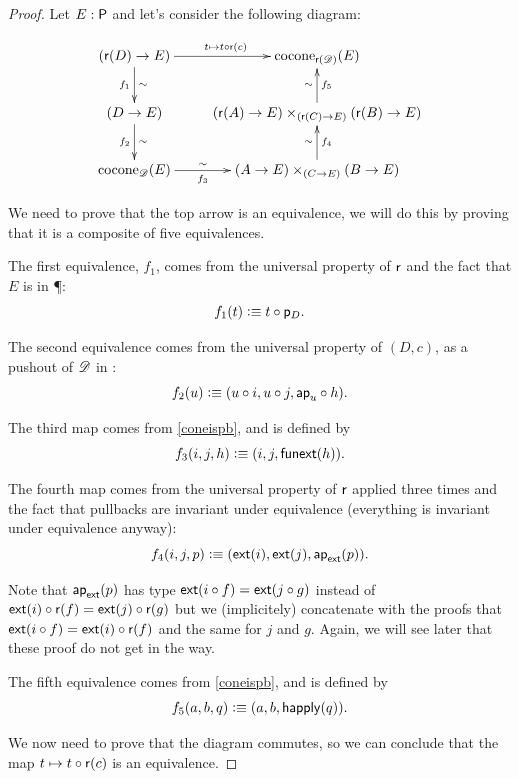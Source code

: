 \begin{proof}
  Let $E:\P$ and let's consider the following diagram:

  \[\xymatrix{ (\reflect(D)\to E)
    \ar^{t\mapsto{}\composecocone{t}{\reflect(c)}}[r] \ar_{f_1}^\sim[d]
    &
    \cocone{\reflect(\Ddiag)}{E}\\
    (D\to E) \ar_{f_2}^\sim[d] &
    (\reflect(A)\to{}E)\times_{(\reflect(C)\to{}E)}(\reflect(B)\to{}E)
    \ar_{f_5}^\sim[u] \\
    \cocone{\Ddiag}{E}\ar_-{f_3}^-\sim[r] & (A\to{}E)\times_{(C\to{}E)}(B\to{}E)
    \ar_{f_4}^\sim[u] }\]

  We need to prove that the top arrow is an equivalence, we will do this by
  proving that it is a composite of five equivalences.

  The first equivalence, $f_1$, comes from the universal property of $\reflect$ and the fact
  that $E$ is in \P:
  \[f_1(t) \defeq t\circ\project_D.\]

  The second equivalence comes from the universal property of $(D,c)$, as a pushout of
  $\Ddiag$ in \type:
  \[f_2(u) \defeq (u\circ{}i,u\circ{}j,\mapfunc{u}\circ{}h).\]

  The third map comes from \autoref{coneispb}, and is defined by
  \[f_3(i,j,h) \defeq (i,j,\funext(h)).\]

  The fourth map comes from the universal property of $\reflect$ applied three
  times and the fact that pullbacks are invariant under equivalence (everything
  is invariant under equivalence anyway):
  \[f_4(i,j,p) \defeq (\ext(i),\ext(j),\mapfunc{\ext}(p)).\]

  Note that $\mapfunc{\ext}(p)$ has type $\ext(i\circ{}f)=\ext(j\circ{}g)$
  instead of $\ext(i)\circ\reflect(f)=\ext(j)\circ\reflect(g)$ but we
  (implicitely) concatenate with the proofs that
  $\ext(i\circ{}f)=\ext(i)\circ\reflect(f)$ and the same for $j$ and $g$. Again,
  we will see later that these proof do not get in the way.

  The fifth equivalence comes from \autoref{coneispb}, and is defined by
  \[f_5(a,b,q) \defeq (a,b,\happly(q)).\]

  We now need to prove that the diagram commutes, so we can conclude that the map
  $t\mapsto{}t\circ\reflect(c)$ is an equivalence.


\end{proof}
